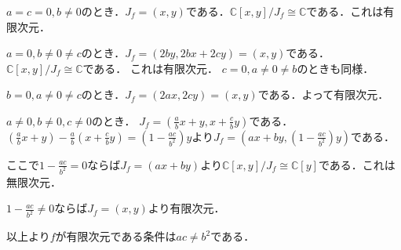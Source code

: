 \documentclass[
		book,
		head_space=20mm,
		foot_space=20mm,
		gutter=10mm,
		line_length=190mm
]{jlreq}
\begin{document}
$a=c=0,b\neq 0$のとき．$J_f=(x,y)$である．$\mathbb{C}[x,y]/J_f \cong \mathbb{C}$である．これは有限次元．

$a=0,b\neq 0\neq c$のとき．$J_f=(2by,2bx+2cy)=(x,y)$である．$\mathbb{C}[x,y]/J_f \cong \mathbb{C}$である．
これは有限次元．
$c=0,a\neq 0\neq b$のときも同様．

$b=0,a\neq 0\neq c$のとき．$J_f=(2ax,2cy)=(x,y)$である．よって有限次元．

$a\neq 0,b\neq 0,c\neq 0$のとき．
$J_f=(\frac{a}{b}x+y,x+\frac{c}{b}y)$である．$(\frac{a}{b}x+y)-\frac{a}{b}(x+\frac{c}{b}y)=(1-\frac{ac}{b^2})y$より$J_f=(ax+by,(1-\frac{ac}{b^2})y)$である．

ここで$1-\frac{ac}{b^2}=0$ならば$J_f=(ax+by)$より$\mathbb{C}[x,y]/J_f \cong \mathbb{C}[y]$である．これは無限次元．

$1-\frac{ac}{b^2}\neq 0$ならば$J_f=(x,y)$より有限次元．

以上より$f$が有限次元である条件は$ac \neq b^2$である．
\end{document}
